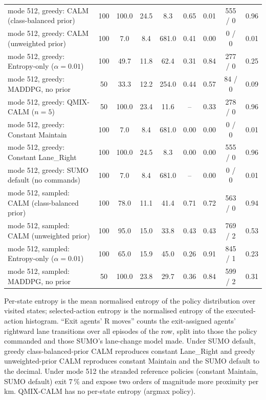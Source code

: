 \begin{table}[t]
{\begin{tabular}{lcccccccc}
\midrule
mode 512, greedy: CALM (class-balanced prior) & 100 & 100.0 & 24.5 & 8.3 & 0.65 & 0.01 & 555 / 0 & 0.96 \\
mode 512, greedy: CALM (unweighted prior) & 100 & 7.0 & 8.4 & 681.0 & 0.41 & 0.00 & 0 / 0 & 0.01 \\
mode 512, greedy: Entropy-only ($\alpha=0.01$) & 100 & 49.7 & 11.8 & 62.4 & 0.31 & 0.84 & 277 / 0 & 0.25 \\
mode 512, greedy: MADDPG, no prior & 50 & 33.3 & 12.2 & 254.0 & 0.44 & 0.57 & 84 / 0 & 0.09 \\
mode 512, greedy: QMIX-CALM ($n=5$) & 50 & 100.0 & 23.4 & 11.6 & -- & 0.33 & 278 / 0 & 0.96 \\
mode 512, greedy: Constant Maintain & 100 & 7.0 & 8.4 & 681.0 & 0.00 & 0.00 & 0 / 0 & 0.01 \\
mode 512, greedy: Constant Lane\_Right & 100 & 100.0 & 24.5 & 8.3 & 0.00 & 0.00 & 555 / 0 & 0.96 \\
mode 512, greedy: SUMO default (no commands) & 100 & 7.0 & 8.4 & 681.0 & -- & 0.00 & 0 / 0 & 0.01 \\
\midrule
mode 512, sampled: CALM (class-balanced prior) & 100 & 78.0 & 11.1 & 41.4 & 0.71 & 0.72 & 563 / 0 & 0.94 \\
mode 512, sampled: CALM (unweighted prior) & 100 & 95.0 & 15.0 & 33.8 & 0.43 & 0.43 & 769 / 2 & 0.53 \\
mode 512, sampled: Entropy-only ($\alpha=0.01$) & 100 & 65.0 & 15.9 & 45.0 & 0.26 & 0.91 & 845 / 1 & 0.23 \\
mode 512, sampled: MADDPG, no prior & 50 & 100.0 & 23.8 & 29.7 & 0.36 & 0.84 & 599 / 2 & 0.31 \\
\bottomrule
\end{tabular}}
\vspace{1mm}
\parbox{\textwidth}{\scriptsize Per-state entropy is the mean normalised entropy of the policy distribution over visited states; selected-action entropy is the normalised entropy of the executed-action histogram. ``Exit agents' R moves'' counts the exit-assigned agents' rightward lane transitions over all episodes of the row, split into those the policy commanded and those SUMO's lane-change model made. Under SUMO default, greedy class-balanced-prior CALM reproduces constant Lane\_Right and greedy unweighted-prior CALM reproduces constant Maintain and the SUMO default to the decimal. Under mode 512 the stranded reference policies (constant Maintain, SUMO default) exit 7\,\% and expose two orders of magnitude more proximity per km. QMIX-CALM has no per-state entropy (argmax policy).}
\end{table}
